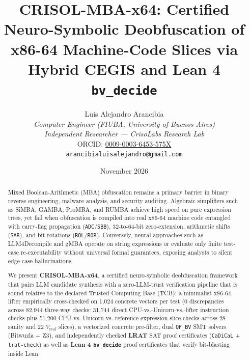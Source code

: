 \documentclass[11pt,a4paper]{article}
\title{\textbf{CRISOL-MBA-x64: Certified Neuro-Symbolic Deobfuscation of x86-64 Machine-Code Slices via Hybrid CEGIS and Lean 4 \texttt{bv\_decide}}}
\author{
  Luis Alejandro Arancibia\\
  \textit{Computer Engineer (FIUBA, University of Buenos Aires)}\\
  \textit{Independent Researcher --- CrisoLabs Research Lab}\\
  ORCID: \href{https://orcid.org/0009-0003-6453-575X}{0009-0003-6453-575X}\\
  \texttt{arancibialuisalejandro@gmail.com}
}
\date{November 2026}
\begin{document}
\maketitle

\begin{abstract}
Mixed Boolean-Arithmetic (MBA) obfuscation remains a primary barrier in binary reverse engineering, malware analysis, and security auditing. Algebraic simplifiers such as SiMBA, GAMBA, ProMBA, and RUMBA achieve high speed on pure expression trees, yet fail when obfuscation is compiled into real x86-64 machine code entangled with carry-flag propagation (\texttt{ADC}/\texttt{SBB}), 32-to-64-bit zero-extension, arithmetic shifts (\texttt{SAR}), and bit rotations (\texttt{ROL}/\texttt{ROR}). Conversely, neural approaches such as LLM4Decompile and gMBA operate on string expressions or evaluate only finite test-case re-executability without universal formal guarantees, exposing analysts to silent edge-case hallucinations.

We present \textbf{CRISOL-MBA-x64}, a certified neuro-symbolic deobfuscation framework that pairs LLM candidate synthesis with a zero-LLM-trust verification pipeline that is sound relative to the declared Trusted Computing Base (TCB): a minimalist x86-64 lifter empirically cross-checked on 1,024 concrete vectors per test (0 discrepancies across 82,944 three-way checks: 31,744 direct CPU-vs.-Unicorn-vs.-lifter instruction checks plus 51,200 CPU-vs.-Unicorn-vs.-reference-expression slice checks across 28 sanity and 22 $V_{\mathrm{real}}$ slices), a vectorized concrete pre-filter, dual \texttt{QF\_BV} SMT solvers (Bitwuzla + Z3), and independently checked \textbf{LRAT} SAT proof certificates (\texttt{CaDiCaL} + \texttt{lrat-check}) as well as \textbf{Lean 4 \texttt{bv\_decide}} proof certificates that verify bit-blasting inside Lean.


\end{abstract}
\end{document}
